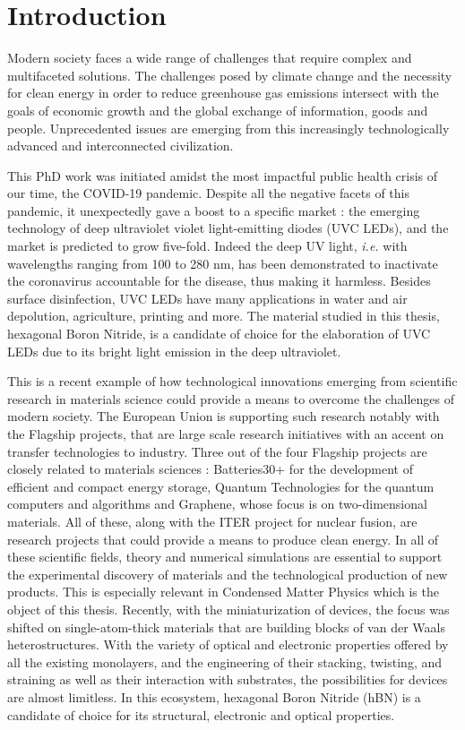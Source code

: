 \chapter*{Introduction}
%
\linenumbers
%
Modern society faces a wide range of challenges that require complex and multifaceted solutions. The challenges posed by climate change and the necessity for clean energy in order to reduce greenhouse gas emissions intersect with the goals of economic growth and the global exchange of information, goods and people. Unprecedented issues are emerging from this increasingly technologically advanced and interconnected civilization. 

This PhD work was initiated amidst the most impactful public health crisis of our time, the COVID-19 pandemic. Despite all the negative facets of this pandemic, it unexpectedly gave a boost to a specific market : the emerging technology of deep ultraviolet violet light-emitting diodes (UVC LEDs), and the market is predicted to grow five-fold.\cite{Yole} Indeed the deep UV light, \textit{i.e.} with wavelengths ranging from 100 to 280 nm, has been demonstrated to inactivate the coronavirus accountable for the disease, thus making it harmless.\cite{GERCHMAN2020112044} Besides surface disinfection, UVC LEDs have many applications in water and air depolution, agriculture, printing and more.\cite{hsu2021perspectives} The material studied in this thesis, hexagonal Boron Nitride, is a candidate of choice for the elaboration of UVC LEDs due to its bright light emission in the deep ultraviolet.

This is a recent example of how technological innovations emerging from scientific research in materials science could provide a means to overcome the challenges of modern society. The European Union is supporting such research notably with the Flagship projects, that are large scale research initiatives with an accent on transfer technologies to industry. Three out of the four Flagship projects are closely related to materials sciences : Batteries30+ for the development of efficient and compact energy storage, Quantum Technologies for the quantum computers and algorithms and Graphene, whose focus is on two-dimensional materials. All of these, along with the ITER project for nuclear fusion, are research projects that could provide a means to produce clean energy. In all of these scientific fields, theory and numerical simulations are essential to support the experimental discovery of materials and the technological production of new products. This is especially relevant in Condensed Matter Physics which is the object of this thesis. Recently, with the miniaturization of devices, the focus was shifted on single-atom-thick materials that are building blocks of van der Waals heterostructures.
With the variety of optical and electronic properties offered by all the existing monolayers, and the engineering of their stacking, twisting, and straining as well as their interaction with substrates, the possibilities for devices are almost limitless. In this ecosystem, hexagonal Boron Nitride (hBN) is a candidate of choice for its structural, electronic and optical properties.

